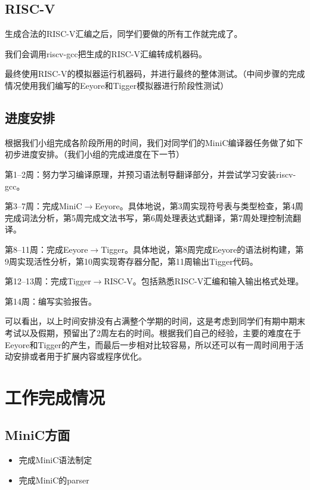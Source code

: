 \documentclass[a4paper]{ctexart}
\begin{document}
\subsection{RISC-V}

生成合法的RISC-V汇编之后，同学们要做的所有工作就完成了。

我们会调用riscv-gcc把生成的RISC-V汇编转成机器码。

最终使用RISC-V的模拟器运行机器码，并进行最终的整体测试。（中间步骤的完成情况使用我们编写的Eeyore和Tigger模拟器进行阶段性测试）

\subsection{进度安排}

根据我们小组完成各阶段所用的时间，我们对同学们的MiniC编译器任务做了如下初步进度安排。（我们小组的完成进度在下一节）

第1--2周：努力学习编译原理，并预习语法制导翻译部分，并尝试学习安装riscv-gcc。

第3--7周：完成MiniC$\rightarrow$Eeyore。具体地说，第3周实现符号表与类型检查，第4周完成词法分析，第5周完成文法书写，第6周处理表达式翻译，第7周处理控制流翻译。

第8--11周：完成Eeyore$\rightarrow$Tigger。具体地说，第8周完成Eeyore的语法树构建，第9周实现活性分析，第10周实现寄存器分配，第11周输出Tigger代码。

第12--13周：完成Tigger$\rightarrow$RISC-V。包括熟悉RISC-V汇编和输入输出格式处理。

第14周：编写实验报告。

可以看出，以上时间安排没有占满整个学期的时间，这是考虑到同学们有期中期末考试以及假期，预留出了2周左右的时间。根据我们自己的经验，主要的难度在于Eeyore和Tigger的产生，而最后一步相对比较容易，所以还可以有一周时间用于活动安排或者用于扩展内容或程序优化。

\newpage
\section{工作完成情况}

\subsection{MiniC方面}
\begin{itemize}
	\item 完成MiniC语法制定
	\item 完成MiniC的parser
\end{itemize}
\end{document}
